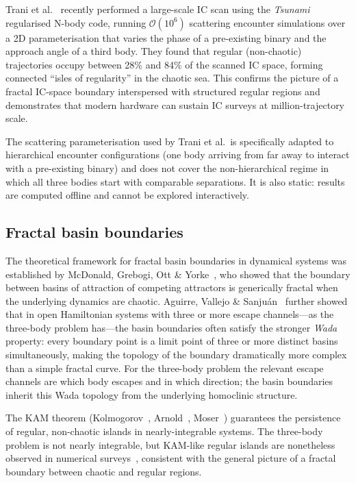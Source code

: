 \documentclass[11pt,a4paper]{article}
\begin{document}
Trani et al.~\cite{trani2024} recently performed a large-scale IC scan using the \emph{Tsunami}
regularised N-body code, running $\mathcal{O}(10^6)$ scattering encounter simulations over a
2D parameterisation that varies the phase of a pre-existing binary and the approach angle of a
third body.  They found that regular (non-chaotic) trajectories occupy between 28\% and 84\% of
the scanned IC space, forming connected ``isles of regularity'' in the chaotic sea.  This
confirms the picture of a fractal IC-space boundary interspersed with structured regular
regions and demonstrates that modern hardware can sustain IC surveys at million-trajectory scale.

The scattering parameterisation used by Trani et al.\ is specifically adapted to hierarchical
encounter configurations (one body arriving from far away to interact with a pre-existing
binary) and does not cover the non-hierarchical regime in which all three bodies start with
comparable separations.  It is also static: results are computed offline and cannot be explored
interactively.

\subsection{Fractal basin boundaries}

The theoretical framework for fractal basin boundaries in dynamical systems was established by
McDonald, Grebogi, Ott \& Yorke~\cite{mcdonald1985}, who showed that the boundary between
basins of attraction of competing attractors is generically fractal when the underlying dynamics
are chaotic.  Aguirre, Vallejo \& Sanju\'{a}n~\cite{aguirre2001} further showed that in open
Hamiltonian systems with three or more escape channels---as the three-body problem has---the
basin boundaries often satisfy the stronger \emph{Wada} property: every boundary point is a
limit point of three or more distinct basins simultaneously, making the topology of the
boundary dramatically more complex than a simple fractal curve.  For the three-body problem
the relevant escape channels are which body escapes and in which direction; the basin
boundaries inherit this Wada topology from the underlying homoclinic structure.

The KAM theorem (Kolmogorov~\cite{kolmogorov1954}, Arnold~\cite{arnold1963},
Moser~\cite{moser1962}) guarantees the persistence of regular, non-chaotic islands in
nearly-integrable systems.  The three-body problem is not nearly integrable, but KAM-like
regular islands are nonetheless observed in numerical surveys~\cite{trani2024}, consistent with
the general picture of a fractal boundary between chaotic and regular regions.
\end{document}
